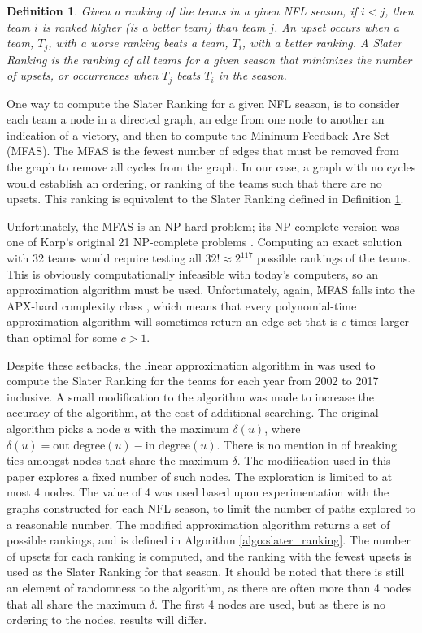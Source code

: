 \documentclass[11pt]{article}
\newtheorem{definition}{Definition}
\begin{document}
\begin{definition}\label{def:slater_ranking}
Given a ranking of the teams in a given NFL season, if $i < j$, then team $i$ is ranked higher (is a better team) than team $j$. An upset occurs when a team, $T_j$, with a worse ranking beats a team, $T_i$, with a better ranking. A Slater Ranking is the ranking of all teams for a given season that minimizes the number of upsets, or occurrences when $T_j$ beats $T_i$ in the season.
\end{definition}

One way to compute the Slater Ranking for a given NFL season, is to consider each team a node in a directed graph, an edge from one node to another an indication of a victory, and then to compute the Minimum Feedback Arc Set (MFAS). The MFAS is the fewest number of edges that must be removed from the graph to remove all cycles from the graph. In our case, a graph with no cycles would establish an ordering, or ranking of the teams such that there are no upsets. This ranking is equivalent to the Slater Ranking defined in Definition \ref{def:slater_ranking}.

Unfortunately, the MFAS is an NP-hard problem; its NP-complete version was one of Karp's original 21 NP-complete problems \cite{karp_complexity}. Computing an exact solution with 32 teams would require testing all $32! \approx 2^{117}$ possible rankings of the teams. This is obviously computationally infeasible with today's computers, so an approximation algorithm must be used. Unfortunately, again, MFAS falls into the APX-hard complexity class \cite{kann_approx}, which means that every polynomial-time approximation algorithm will sometimes return an edge set that is $c$ times larger than optimal for some $c > 1$.

Despite these setbacks, the linear approximation algorithm in \cite{Saab2001} was used to compute the Slater Ranking for the teams for each year from 2002 to 2017 inclusive. A small modification to the algorithm was made to increase the accuracy of the algorithm, at the cost of additional searching. The original algorithm picks a node $u$ with the maximum $\delta(u)$, where $\delta(u) = \text{out degree}(u) - \text{in degree}(u)$. There is no mention in \cite{Saab2001} of breaking ties amongst nodes that share the maximum $\delta$. The modification used in this paper explores a fixed number of such nodes. The exploration is limited to at most 4 nodes. The value of 4 was used based upon experimentation with the graphs constructed for each NFL season, to limit the number of paths explored to a reasonable number. The modified approximation algorithm returns a set of possible rankings, and is defined in Algorithm \ref{algo:slater_ranking}. The number of upsets for each ranking is computed, and the ranking with the fewest upsets is used as the Slater Ranking for that season. It should be noted that there is still an element of randomness to the algorithm, as there are often more than 4 nodes that all share the maximum $\delta$. The first 4 nodes are used, but as there is no ordering to the nodes, results will differ.
\end{document}
